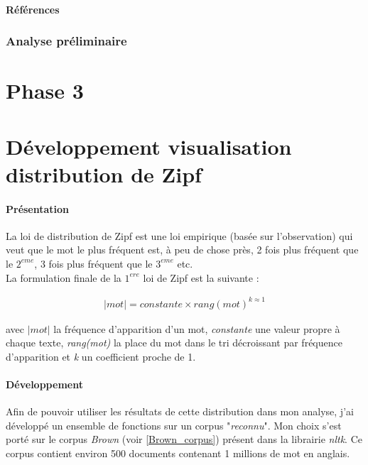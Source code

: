 \documentclass[a4paper,12pt]{article}
\begin{document}
			\paragraph{Références}
							
				
		\subsubsection{Analyse préliminaire}

\newpage
\section{Phase 3}

\newpage	
\appendix
\section{Développement visualisation distribution de Zipf}
	\paragraph{Présentation}
		La loi de distribution de Zipf est une loi empirique (basée sur l'observation) qui veut que le mot le plus fréquent est, à peu de chose près, 2 fois plus fréquent que le $2^{eme}$, 3 fois plus fréquent que le $3^{eme}$ etc.\\
		
		La formulation finale de la $1^{ere}$ loi de Zipf est la suivante :
		
		\begin{align*}
				|mot| = constante \times rang(mot)^{k \approx 1}
		\end{align*}
		
		avec \emph{$|mot|$} la fréquence d'apparition d'un mot, \emph{constante} une valeur propre à chaque texte, \emph{rang(mot)} la place du mot dans le tri décroissant par fréquence d'apparition et \emph{k} un coefficient proche de 1. 
		
	\paragraph{Développement}
		Afin de pouvoir utiliser les résultats de cette distribution dans mon analyse, j'ai développé un ensemble de fonctions sur un corpus "\emph{reconnu}". Mon choix s'est porté sur le corpus \emph{Brown} (voir \ref{Brown_corpus}) présent dans la librairie \emph{nltk}. Ce corpus contient environ 500 documents contenant 1 millions de mot en anglais.\\
		
\end{document}
